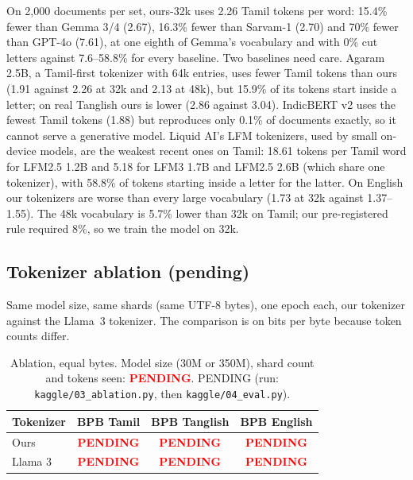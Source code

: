 \documentclass[11pt]{article}
\newcommand{\pending}{\textcolor{red}{\textbf{PENDING}}}
\begin{document}
On 2,000 documents per set, ours-32k uses 2.26 Tamil tokens per word: 15.4\% fewer than Gemma 3/4 (2.67), 16.3\% fewer than Sarvam-1 (2.70) and 70\% fewer than GPT-4o (7.61), at one eighth of Gemma's vocabulary and with 0\% cut letters against 7.6--58.8\% for every baseline. Two baselines need care. Agaram 2.5B, a Tamil-first tokenizer with 64k entries, uses fewer Tamil tokens than ours (1.91 against 2.26 at 32k and 2.13 at 48k), but 15.9\% of its tokens start inside a letter; on real Tanglish ours is lower (2.86 against 3.04). IndicBERT v2 uses the fewest Tamil tokens (1.88) but reproduces only 0.1\% of documents exactly, so it cannot serve a generative model. Liquid AI's LFM tokenizers, used by small on-device models, are the weakest recent ones on Tamil: 18.61 tokens per Tamil word for LFM2.5 1.2B and 5.18 for LFM3 1.7B and LFM2.5 2.6B (which share one tokenizer), with 58.8\% of tokens starting inside a letter for the latter. On English our tokenizers are worse than every large vocabulary (1.73 at 32k against 1.37--1.55). The 48k vocabulary is 5.7\% lower than 32k on Tamil; our pre-registered rule required 8\%, so we train the model on 32k.

\subsection{Tokenizer ablation (pending)}
Same model size, same shards (same UTF-8 bytes), one epoch each, our tokenizer against the Llama~3 tokenizer.
The comparison is on bits per byte because token counts differ.

\begin{table}[t]
\centering
\small
\begin{tabular}{lccc}
\toprule
Tokenizer & BPB Tamil & BPB Tanglish & BPB English \\
\midrule
Ours & \pending & \pending & \pending \\
Llama 3 & \pending & \pending & \pending \\
\bottomrule
\end{tabular}
\caption{Ablation, equal bytes. Model size (30M or 350M), shard count and tokens seen: \pending. PENDING (run: \texttt{kaggle/03\_ablation.py}, then \texttt{kaggle/04\_eval.py}).}
\label{tab:ablation}
\end{table}
\end{document}
